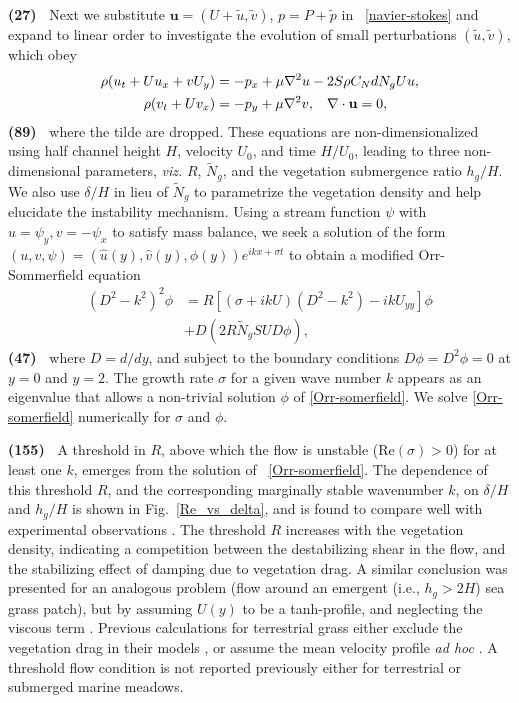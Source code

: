 \documentclass[aps,prl,reprint,twocolumn,superscriptaddress,sort&compress,10pt]{revtex4-1}  %
\newcommand{\bu}{\mathbf{u}}
\newcommand{\hg}{h_g}
\newcommand{\Rey}{{R}}
\newcommand{\Ndg}{\tilde{N}_g}
\newcommand{\words}[1]{\textbf{(#1)~}}
\begin{document}
\words{27} Next we substitute $\bu = (U+\tilde{u}, \tilde{v})$, $p=P+\tilde{p}$ in ~\eqref{navier-stokes} and expand to linear order to investigate the evolution of small perturbations $(\tilde{u}, \tilde{v})$, which obey
\begin{equation}
\begin{split}
\rho(u_t+U u_x+vU_y) &= -p_x+ {\mu}\nabla^2u-2S\rho C_{N}dN_{g}Uu, \\
\rho(v_t+ Uv_x) &= -p_y+ {\mu}\nabla^2v, \hspace{0.3cm} \nabla\cdot\bu=0,
\end{split} \nonumber
\end{equation}
\words{89} where the tilde are dropped.
These equations are non-dimensionalized using half channel height $H$, velocity $U_0$, and time $H/U_0$, leading to three non-dimensional parameters, \textit{viz.} $\Rey$, $\Ndg$, and the vegetation submergence ratio $\hg/H$. 
We also use $\delta/H$ in lieu of $\Ndg$ to parametrize the vegetation density and help elucidate the instability mechanism. 
Using a stream function $\psi$ with $u = \psi_{y}, v= -\psi_x$ to satisfy mass balance, we seek a solution of 
the form $\left(u,v,\psi \right)= \left(\hat u(y), \hat v(y), \phi(y) \right)e^{ikx+\sigma t}$ to obtain a modified Orr-Sommerfield equation \cite{Drazin81} 
\begin{equation}
\begin{split}
\left(D^2 -k^{2} \right)^2\phi &= \Rey \left[ \left({\sigma}+ikU\right) \left(D^2-k^2\right) -ikU_{yy}\right]\phi \\
&+D\left(2R \Ndg S U D \phi\right),
\label{Orr-somerfield}
\end{split}
\end{equation}
\words{47} where $D=d/dy$, and subject to the boundary conditions $D\phi = D^2\phi = 0$ at $y=0$ and $y=2$. 
The growth rate $\sigma$ for a given wave number $k$ appears as an eigenvalue that allows a non-trivial solution $\phi$ of  \eqref{Orr-somerfield}.
We solve \eqref{Orr-somerfield} numerically for $\sigma$ and $\phi$.

\words{155} A threshold in $\Rey$, above which the flow is unstable (Re$(\sigma)>0$) for at least one $k$, emerges from the solution of ~\eqref{Orr-somerfield}. 
The dependence of this threshold $\Rey$, and the corresponding marginally stable wavenumber $k$, on $\delta/H$ and $\hg/H$ is shown in Fig.~\ref{Re_vs_delta}, and is found to compare well with experimental observations \cite{Ghisal02}.
The threshold $\Rey$ increases with the vegetation density, indicating a competition between the destabilizing shear in the flow, and the stabilizing effect of damping due to vegetation drag.
A similar conclusion was presented for an analogous problem (flow around an emergent (i.e., $\hg>2H$) sea grass patch), but by assuming $U(y)$ to be a tanh-profile, and neglecting the viscous term \cite{White07}.
Previous calculations for terrestrial grass either exclude the vegetation drag in their models \cite{Raupach96}, or assume the mean velocity profile \textit{ad hoc} \cite{Raupach96,Delangre06}.
A threshold flow condition is not reported previously either for terrestrial or submerged marine meadows.
\end{document}
